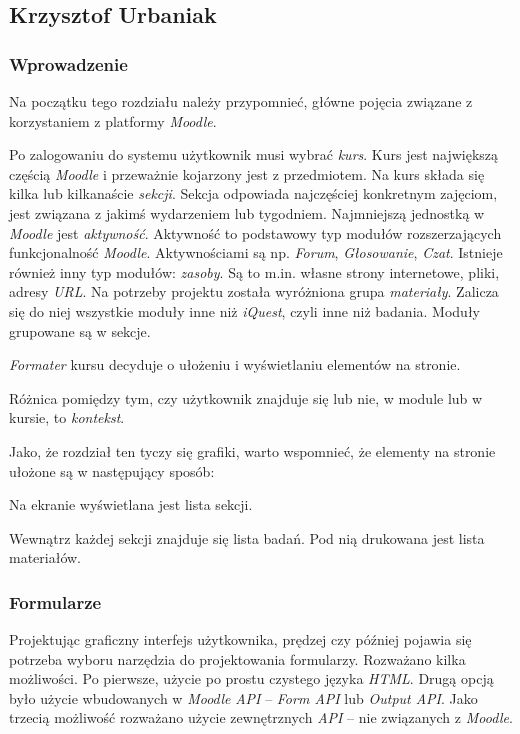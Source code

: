 \subsection{Krzysztof Urbaniak}
\subsubsection{Wprowadzenie}
Na początku tego rozdziału należy przypomnieć, główne pojęcia związane z korzystaniem z platformy \emph{Moodle}.

Po zalogowaniu do systemu użytkownik musi wybrać \emph{kurs}. Kurs jest największą częścią \emph{Moodle} i przeważnie kojarzony jest z przedmiotem. Na kurs składa się kilka lub kilkanaście \emph{sekcji}. Sekcja odpowiada najczęściej konkretnym zajęciom, jest związana z jakimś wydarzeniem lub tygodniem. Najmniejszą jednostką w \emph{Moodle} jest \emph{aktywność}. Aktywność to podstawowy typ modułów rozszerzających funkcjonalność \emph{Moodle}. Aktywnościami są np. \emph{Forum}, \emph{Głosowanie}, \emph{Czat}. Istnieje również inny typ modułów: \emph{zasoby}. Są to m.in. własne strony internetowe, pliki, adresy \emph{URL}. Na potrzeby projektu została wyróżniona grupa \emph{materiały}. Zalicza się do niej wszystkie moduły inne niż \emph{iQuest}, czyli inne niż badania. Moduły grupowane są w sekcje.

\emph{Formater} kursu decyduje o ułożeniu i wyświetlaniu elementów na stronie.

Różnica pomiędzy tym, czy użytkownik znajduje się lub nie, w module lub w kursie, to \emph{kontekst}.

Jako, że rozdział ten tyczy się grafiki, warto wspomnieć, że elementy na stronie ułożone są w następujący sposób:
\begin{description}
\item Na ekranie wyświetlana jest lista sekcji.
\item Wewnątrz każdej sekcji znajduje się lista badań. Pod nią drukowana jest lista materiałów.
\end{description}

\subsubsection{Formularze}
Projektując graficzny interfejs użytkownika, prędzej czy później pojawia się potrzeba wyboru narzędzia do projektowania formularzy. Rozważano kilka możliwości. Po pierwsze, użycie po prostu czystego języka \emph{HTML}. Drugą opcją było użycie wbudowanych w \emph{Moodle} \emph{API} -- \emph{Form API} lub \emph{Output API}. Jako trzecią możliwość rozważano użycie zewnętrznych \emph{API} -- nie związanych z \emph{Moodle}.


